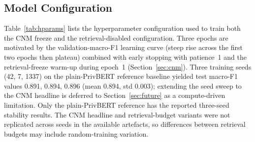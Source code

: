 \documentclass[final,3p,times,twocolumn]{elsarticle}
\begin{document}
	\subsection{Model Configuration}
	Table~\ref{tab:hparams} lists the hyperparameter configuration used to train
	both the CNM freeze and the retrieval-disabled configuration. Three epochs are
	motivated by the validation-macro-F1 learning curve (steep rise across the
	first two epochs then plateau) combined with early stopping with patience~1 and
	the retrieval-freeze warm-up during epoch~1 (Section~\ref{sec:cnm}). Three
	training seeds (42, 7, 1337) on the plain-PrivBERT reference baseline yielded
	test macro-F1 values 0.891, 0.894, 0.896 (mean 0.894, std 0.003); extending
	the seed sweep to the CNM headline is deferred to Section~\ref{sec:future} as
	a compute-driven limitation.
	Only the plain-PrivBERT reference has the reported three-seed stability
	results. The CNM headline and retrieval-budget variants were not replicated
	across seeds in the available artefacts, so differences between retrieval
	budgets may include random-training variation.
\end{document}
